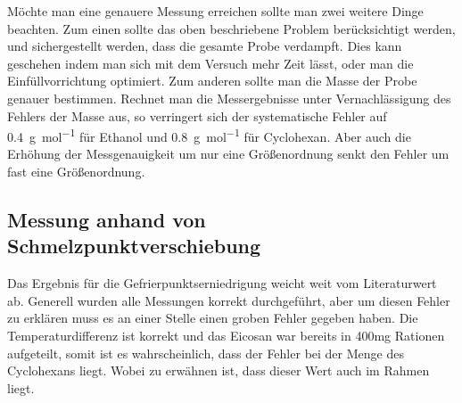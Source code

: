 Möchte man eine genauere Messung erreichen sollte man zwei weitere Dinge beachten. Zum einen sollte das oben beschriebene Problem berücksichtigt werden, und sichergestellt werden, dass die gesamte Probe verdampft. Dies kann geschehen indem man sich mit dem Versuch mehr Zeit lässt, oder man die Einfüllvorrichtung optimiert. Zum anderen sollte man die Masse der Probe genauer bestimmen. Rechnet man die Messergebnisse unter Vernachlässigung des Fehlers der Masse aus, so verringert sich der systematische Fehler auf \SI{.4}{\g\per\mol} für Ethanol und \SI{.8}{\g\per\mol} für Cyclohexan. Aber auch die Erhöhung der Messgenauigkeit um nur eine Größenordnung senkt den Fehler um fast eine Größenordnung.

\subsection{Messung anhand von Schmelzpunktverschiebung}

Das Ergebnis für die Gefrierpunktserniedrigung weicht weit vom Literaturwert
ab. Generell wurden alle Messungen korrekt durchgeführt, aber um diesen
Fehler zu erklären muss es an einer Stelle einen groben Fehler gegeben
haben. Die Temperaturdifferenz ist korrekt und das Eicosan war bereits
in 400mg Rationen aufgeteilt, somit ist es wahrscheinlich, dass der
Fehler bei der Menge des Cyclohexans liegt. Wobei zu erwähnen ist,
dass dieser Wert auch im Rahmen liegt. 